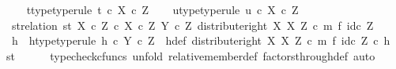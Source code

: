 \begin{isabellebody}
\ \ \isamarkupfalse%
\ t{\isacharunderscore}{\kern0pt}type{\isacharbrackleft}{\kern0pt}type{\isacharunderscore}{\kern0pt}rule{\isacharbrackright}{\kern0pt}{\isacharcolon}{\kern0pt}\ {\isachardoublequoteopen}t\ {\isasymin}\isactrlsub c\ X\ {\isasymtimes}\isactrlsub c\ Z{\isachardoublequoteclose}\isanewline
\ \ \isamarkupfalse%
\ u{\isacharunderscore}{\kern0pt}type{\isacharbrackleft}{\kern0pt}type{\isacharunderscore}{\kern0pt}rule{\isacharbrackright}{\kern0pt}{\isacharcolon}{\kern0pt}\ {\isachardoublequoteopen}u\ {\isasymin}\isactrlsub c\ X\ {\isasymtimes}\isactrlsub c\ Z{\isachardoublequoteclose}\isanewline
\isanewline
\ \ \isamarkupfalse%
\ st{\isacharunderscore}{\kern0pt}relation{\isacharcolon}{\kern0pt}\ {\isachardoublequoteopen}{\isasymlangle}s{\isacharcomma}{\kern0pt}t{\isasymrangle}\ {\isasymin}\isactrlbsub {\isacharparenleft}{\kern0pt}X\ {\isasymtimes}\isactrlsub c\ Z{\isacharparenright}{\kern0pt}\ {\isasymtimes}\isactrlsub c\ X\ {\isasymtimes}\isactrlsub c\ Z\isactrlesub \ {\isacharparenleft}{\kern0pt}Y\ {\isasymtimes}\isactrlsub c\ Z{\isacharcomma}{\kern0pt}\ distribute{\isacharunderscore}{\kern0pt}right\ X\ X\ Z\ {\isasymcirc}\isactrlsub c\ m\ {\isasymtimes}\isactrlsub f\ id\isactrlsub c\ Z{\isacharparenright}{\kern0pt}{\isachardoublequoteclose}\isanewline
\ \ \isamarkupfalse%
\ \isamarkupfalse%
\ h\ \ h{\isacharunderscore}{\kern0pt}type{\isacharbrackleft}{\kern0pt}type{\isacharunderscore}{\kern0pt}rule{\isacharbrackright}{\kern0pt}{\isacharcolon}{\kern0pt}\ {\isachardoublequoteopen}h\ {\isasymin}\isactrlsub c\ Y\ {\isasymtimes}\isactrlsub c\ Z{\isachardoublequoteclose}\ \ h{\isacharunderscore}{\kern0pt}def{\isacharcolon}{\kern0pt}\ {\isachardoublequoteopen}{\isacharparenleft}{\kern0pt}distribute{\isacharunderscore}{\kern0pt}right\ X\ X\ Z\ {\isasymcirc}\isactrlsub c\ m\ {\isasymtimes}\isactrlsub f\ id\isactrlsub c\ Z{\isacharparenright}{\kern0pt}\ {\isasymcirc}\isactrlsub c\ h\ {\isacharequal}{\kern0pt}\ {\isasymlangle}s{\isacharcomma}{\kern0pt}t{\isasymrangle}{\isachardoublequoteclose}\isanewline
\ \ \ \ \isamarkupfalse%
\ {\isacharparenleft}{\kern0pt}typecheck{\isacharunderscore}{\kern0pt}cfuncs{\isacharcomma}{\kern0pt}\ unfold\ relative{\isacharunderscore}{\kern0pt}member{\isacharunderscore}{\kern0pt}def{}\ factors{\isacharunderscore}{\kern0pt}through{\isacharunderscore}{\kern0pt}def{}{\isacharcomma}{\kern0pt}\ auto{\isacharparenright}{\kern0pt}\isanewline
\ \ \isamarkupfalse%

\end{isabellebody}
